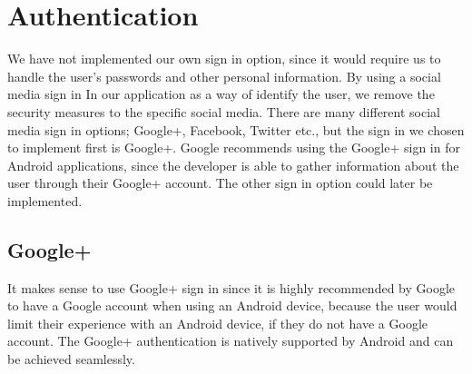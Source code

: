 \section{Authentication}
We have not implemented our own sign in option, since it would require us to handle the user's passwords and other personal information.
By using a social media sign in In our application as a way of identify the user, we remove the security measures to the specific social media.
There are many different social media sign in options; Google+, Facebook, Twitter etc., but the sign in we chosen to implement first is Google+. 
Google recommends using the Google+ sign in for Android applications, since the developer is able to gather information about the user through their Google+ account. The other sign in option could later be implemented.

\subsection{Google+}
It makes sense to use Google+ sign in since it is highly recommended by Google to have a Google account when using an Android device, because the user would limit their experience with an Android device, if they do not have a Google account. 
The Google+ authentication is natively supported by Android and can be achieved seamlessly.  

